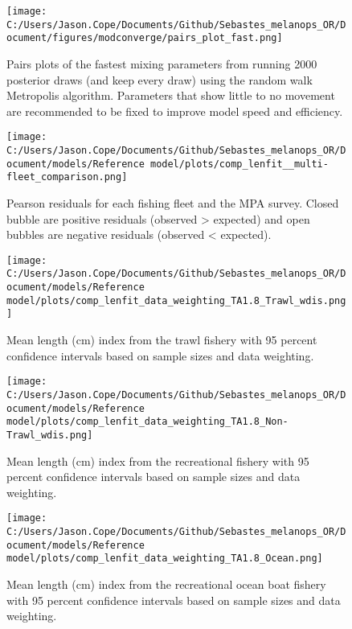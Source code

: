 \documentclass[11pt,
  english,
  letterpaper,
]{article}
\begin{document}
\begin{figure}
\centering
\texttt{[image: C:/Users/Jason.Cope/Documents/Github/Sebastes\_melanops\_OR/Document/figures/modconverge/pairs\_plot\_fast.png]}
\caption{Pairs plots of the fastest mixing parameters from running 2000 posterior draws (and keep every draw) using the random walk Metropolis algorithm. Parameters that show little to no movement are recommended to be fixed to improve model speed and efficiency.\label{fig:pairs_plot_fast}}
\end{figure}

\begin{figure}
\centering
\texttt{[image: C:/Users/Jason.Cope/Documents/Github/Sebastes\_melanops\_OR/Document/models/Reference model/plots/comp\_lenfit\_\_multi-fleet\_comparison.png]}
\caption{Pearson residuals for each fishing fleet and the MPA survey. Closed bubble are positive residuals (observed \textgreater{} expected) and open bubbles are negative residuals (observed \textless{} expected).\label{fig:lt-pearson-resids}}
\end{figure}

\begin{figure}
\centering
\texttt{[image: C:/Users/Jason.Cope/Documents/Github/Sebastes\_melanops\_OR/Document/models/Reference model/plots/comp\_lenfit\_data\_weighting\_TA1.8\_Trawl\_wdis.png]}
\caption{Mean length (cm) index from the trawl fishery with 95 percent confidence intervals based on sample sizes and data weighting.\label{fig:trawl-mean-len-fit}}
\end{figure}

\begin{figure}
\centering
\texttt{[image: C:/Users/Jason.Cope/Documents/Github/Sebastes\_melanops\_OR/Document/models/Reference model/plots/comp\_lenfit\_data\_weighting\_TA1.8\_Non-Trawl\_wdis.png]}
\caption{Mean length (cm) index from the recreational fishery with 95 percent confidence intervals based on sample sizes and data weighting.\label{fig:nontrawl-mean-len-fit}}
\end{figure}

\begin{figure}
\centering
\texttt{[image: C:/Users/Jason.Cope/Documents/Github/Sebastes\_melanops\_OR/Document/models/Reference model/plots/comp\_lenfit\_data\_weighting\_TA1.8\_Ocean.png]}
\caption{Mean length (cm) index from the recreational ocean boat fishery with 95 percent confidence intervals based on sample sizes and data weighting.\label{fig:ocean-mean-len-fit}}
\end{figure}
\end{document}
